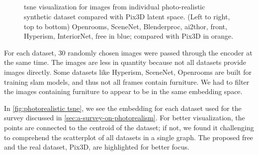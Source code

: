 \begin{figure}[!ht]
    \centering
    \resizebox{0.49\linewidth}{5cm}{}
    \resizebox{0.49\linewidth}{5cm}{}\\
    \resizebox{0.49\linewidth}{5cm}{}
    \resizebox{0.49\linewidth}{5cm}{}\\
    \resizebox{0.49\linewidth}{5cm}{}
    \resizebox{0.49\linewidth}{5cm}{}\\
    \resizebox{0.49\linewidth}{5cm}{}
    \resizebox{0.49\linewidth}{5cm}{}\\
    \caption{\gls{tsne} visualization for images from individual photo-realistic synthetic dataset compared with Pix3D latent space.
        (Left to right, top to bottom) Openrooms, SceneNet, Blenderproc, \gls{ai2thor}, \gls{front}, Hyperism, InteriorNet, \gls{free} in blue;
        compared with Pix3D in orange.}
    \label{fig:tsne per dataset}
\end{figure}

For each dataset, 30 randomly chosen images were passed through the encoder at the same time.
The images are less in quantity because not all datasets provide images directly.
Some datasets like Hyperism, SceneNet, Openrooms are built for training \gls{slam} models, and thus not all frames contain furniture.
We had to filter the images containing furniture to appear to be in the same embedding space.

In \autoref{fig:photorealistic tsne}, we see the embedding for each dataset used for the survey discussed in \autoref{sec:a-survey-on-photorealism}.
For better visualization, the points are connected to the centroid of the dataset;
if not, we found it challenging to comprehend the scatterplot of all datasets in a single graph.
The proposed \gls{free} and the real dataset, Pix3D, are highlighted for better focus.

